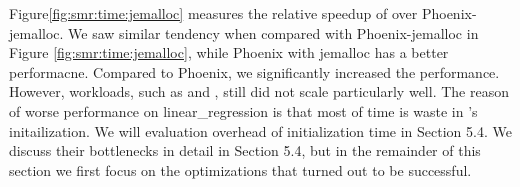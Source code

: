 Figure\ref{fig:smr:time:jemalloc} measures the relative speedup of \myds over Phoenix-jemalloc. 
We saw similar tendency when compared with Phoenix-jemalloc in Figure \ref{fig:smr:time:jemalloc}, while Phoenix with jemalloc has a better performacne.
Compared to Phoenix, we significantly increased the performance.
However, workloads, such as  and , still did not scale particularly well. 
The reason of worse performance on linear\_regression is that most of time is waste in \myds's initailization.
We will evaluation overhead of initialization time in Section 5.4.
We discuss their bottlenecks in detail in Section 5.4, but in the remainder of this section we first focus on the optimizations that turned out to be successful.






%





